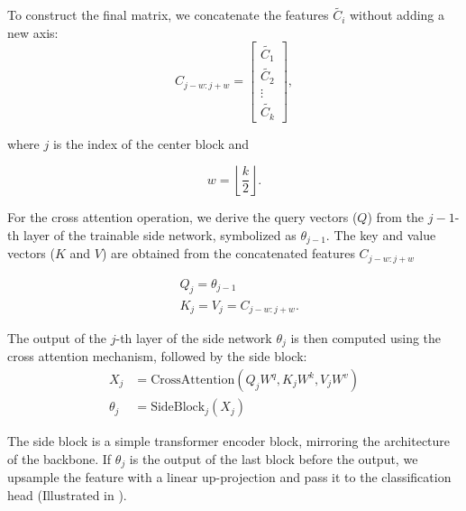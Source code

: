 To construct the final matrix, we concatenate the features \(\tilde{C_i}\) without adding a new axis:
\begin{equation}
C_{j-w:j+w} = \begin{bmatrix} \tilde{C_1} \\ \tilde{C_2} \\ \vdots \\ \tilde{C_k} \end{bmatrix},
\end{equation}

where \(j\) is the index of the center block and

\begin{equation}
    w = \left\lfloor{\frac{k}{2}}\right\rfloor.
\end{equation}

For the cross attention operation, we derive the query vectors (\(Q\)) from the \(j-1\)-th layer of the trainable side network, symbolized as \(\theta_{j-1}\). The key and value vectors (\(K\) and \(V\)) are obtained from the concatenated features \(C_{j-w:j+w}\)

\begin{align}
    &Q_j = \theta_{j-1} \\
    &K_j = V_j = C_{j-w:j+w}.
\end{align}

The output of the \(j\)-th layer of the side network \(\theta_j\) is then computed using the cross attention mechanism, followed by the side block: 
\begin{align}
X_j &= \text{{CrossAttention}}(Q_jW^q, K_jW^k, V_jW^v) \\
\theta_j &= \text{{SideBlock}}_j(X_j)
\end{align}

The side block is a simple transformer encoder block, mirroring the architecture of the backbone. If \(\theta_j\) is the output of the last block before the output, we upsample the feature with a linear up-projection and pass it to the classification head (Illustrated in ).


